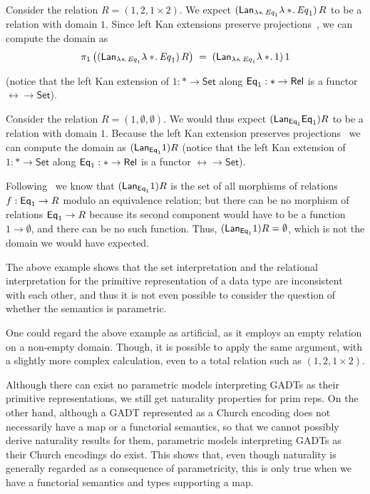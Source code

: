 \documentclass[acmsmall,screen,review,anonymous]{acmart}
\theoremstyle{definition}
\newcommand{\set}{\mathsf{Set}}
\begin{document}
\begin{example}
Consider the relation $R = (1, 2, 1 \times 2)$. We expect
$(\mathit{\mathsf{Lan}}_{\lambda *\!.\,\mathit{Eq}_1} \lambda
*\!.\,\mathit{Eq}_1)\, R$ to be a relation with domain {\color{blue}
  $1$}. Since left Kan extensions preserve projections~\cite{rie16},
we can compute the domain as
\[\pi_1\,\big( (\mathit{\mathsf{Lan}}_{\lambda *\!.\,\mathit{Eq}_1} \lambda
*\!.\,\mathit{Eq}_1) \, R \big)\;=\; (\mathsf{\mathsf{Lan}}_{\lambda
  *\!.\,\mathit{Eq}_1} \lambda *\!. \,1)\, 1\]



(notice that the left
Kan extension of $1 : \ast \to \set$ along $\mathsf{Eq}_1 : \ast \to \mathsf{Rel}$ is
a functor $\rel \to \set$).



Consider the relation $R = (1, \emptyset, \emptyset)$.  We would thus
expect $(\mathsf{\mathsf{Lan}}_{\mathsf{Eq}_1} \mathsf{Eq}_1) R$ to be a relation with domain
$1$.  Because the left Kan extension preserves
projections~\cite{rie16} we can compute the domain as
$(\mathsf{\mathsf{Lan}}_{\mathsf{Eq}_1} 1) R$ (notice that the left Kan extension of
$1 : \ast \to \set$ along $\mathsf{Eq}_1 : \ast \to \mathsf{Rel}$ is a functor $\rel
\to \set$).

Following~\cite{blw03} we know that $(\mathsf{\mathsf{Lan}}_{\mathsf{Eq}_1} 1) R$ is
the set of all morphisms of relations $f : \mathsf{Eq}_1 \to R$ modulo an
equivalence relation; but there can be no morphism of relations $\mathsf{Eq}_1
\to R$ because its second component would have to be a function $1 \to
\emptyset$, and there can be no such function.  Thus,
$(\mathsf{\mathsf{Lan}}_{\mathsf{Eq}_1} 1) R = \emptyset$, which is not the domain we
would have expected.
\end{example}

The above example shows that the set interpretation and the relational
interpretation for the primitive representation of a data type are
inconsistent with each other, and thus it is not even possible to
consider the question of whether the semantics is parametric.

One could regard the above example as artificial, as it employs an
empty relation on a non-empty domain.  Though, it is possible to apply
the same argument, with a slightly more complex calculation, even to a
total relation such as $(1, 2, 1 \times 2)$.



\vspace*{0.2in}

Although there can exist no parametric models interpreting GADTs as
their primitive representations, we still get naturality properties
for prim reps. On the other hand, although a GADT represented as a
Church encoding does not necessarily have a map or a functorial
semantics, so that we cannot possibly derive naturality results for
them, parametric models interpreting GADTs as their Church encodings
do exist.  This shows that, even though naturality is generally
regarded as a consequence of parametricity, this is only true when we
have a functorial semantics and types supporting a map.
\end{document}
